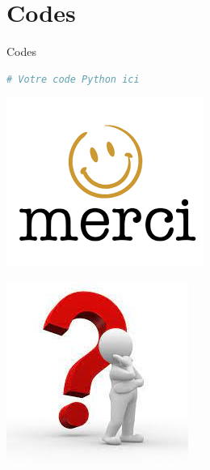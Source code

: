 \documentclass[11pt]{beamer}
\begin{document}
\section{Codes}
\begin{frame}[fragile]{Codes}
    \begin{lstlisting}[language=Python]
        # Votre code Python ici
    \end{lstlisting}
\end{frame}
\begin{frame}
\begin{minipage}{0.48\textwidth}
\centering
\includegraphics[width=\textwidth]{merci2.png}
\end{minipage}\hfill
\begin{minipage}{0.48\textwidth}
\centering
\includegraphics[width=\textwidth]{question.png}
\end{minipage}
\end{frame}
\end{document}
